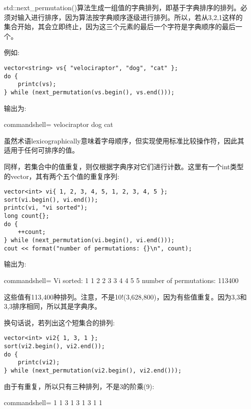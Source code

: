 std::next\_permutation()算法生成一组值的字典排列，即基于字典排序的排列。必须对输入进行排序，因为算法按字典顺序逐级进行排列。所以，若从3,2,1这样的集合开始，其会立即终止，因为这三个元素的最后一个字符是字典顺序的最后一个。

例如:

\begin{lstlisting}[style=styleCXX]
vector<string> vs{ "velociraptor", "dog", "cat" };
do {
	printc(vs);
} while (next_permutation(vs.begin(), vs.end()));
\end{lstlisting}

输出为:

\begin{tcblisting}{commandshell={}}
velociraptor dog cat
\end{tcblisting}

虽然术语lexicographically意味着字母顺序，但实现使用标准比较操作符，因此其适用于任何可排序的值。

同样，若集合中的值重复，则仅根据字典序对它们进行计数。这里有一个int类型的vector，其有两个五个值的重复序列:

\begin{lstlisting}[style=styleCXX]
vector<int> vi{ 1, 2, 3, 4, 5, 1, 2, 3, 4, 5 };
sort(vi.begin(), vi.end());
printc(vi, "vi sorted");
long count{};
do {
	++count;
} while (next_permutation(vi.begin(), vi.end()));
cout << format("number of permutations: {}\n", count);
\end{lstlisting}

输出为:

\begin{tcblisting}{commandshell={}}
Vi sorted: 1 1 2 2 3 3 4 4 5 5
number of permutations: 113400
\end{tcblisting}

这些值有113,400种排列。注意，不是10!(3,628,800)，因为有些值重复。因为3,3和3,3排序相同，所以其是字典序。

换句话说，若列出这个短集合的排列:

\begin{lstlisting}[style=styleCXX]
vector<int> vi2{ 1, 3, 1 };
sort(vi2.begin(), vi2.end());
do {
	printc(vi2);
} while (next_permutation(vi2.begin(), vi2.end()));
\end{lstlisting}

由于有重复，所以只有三种排列，不是3的阶乘(9):

\begin{tcblisting}{commandshell={}}
1 1 3
1 3 1
3 1 1
\end{tcblisting}






